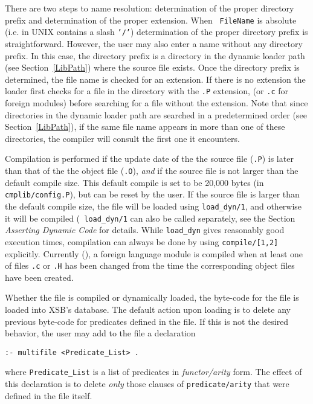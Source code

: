 There are two steps to name resolution: determination of the proper
directory prefix and determination of the proper extension.  When {\tt
FileName} is absolute (i.e. in UNIX contains a slash {\tt '/'})
determination of the proper directory prefix is straightforward.
However, the user may also enter a name without any directory
prefix. In this case, the directory prefix is a directory in the
dynamic loader path (see Section~\ref{LibPath}) where the source file
exists.  Once the directory prefix is determined, the file name is
checked for an extension.  If there is no extension the loader first
checks for a file in the directory with the {\tt .P} extension, (or
{\tt .c} for foreign modules) before searching for a file without the
extension.  Note that since directories in the dynamic loader path are
searched in a predetermined order (see Section~\ref{LibPath}), if the
same file name appears in more than one of these directories, the
compiler will consult the first one it encounters.

Compilation is performed if the update date of the the source file
({\tt *.P}) is later than that of the the object file ({\tt *.O}),
{\em and} if the source file is not larger than the default compile
size.  This default compile is set to be 20,000 bytes (in {\tt
cmplib/config.P}), but can be reset by the user.  If the source file
is larger than the default compile size, the file will be loaded using
{\tt load\_dyn/1}, and otherwise it will be compiled ({\tt
load\_dyn/1} can also be called separately, see the Section {\it
Asserting Dynamic Code} for details.
While {\tt load\_dyn} gives reasonably good execution times,
compilation can always be done by using {\tt compile/[1,2]}
explicitly.  Currently (\version), a foreign language module is
compiled when at least one of files {\tt *.c} or {\tt *.H} has been
changed from the time the corresponding object files have been
created.

Whether the file is compiled or dynamically loaded, the byte-code for
the file is loaded into XSB's database.  The default action upon
loading is to delete any previous byte-code for predicates defined in
the file.  If this is not the desired behavior, the user may add to
the file a declaration 
\begin{center}
{\tt :- multifile <Predicate\_List> .} \\
\end{center}
where {\tt Predicate\_List} is a list of predicates in {\em
functor/arity\/} form.  The effect of this declaration is to delete {\em
only\/} those clauses of {\tt predicate/arity} that were defined in the
file itself.

